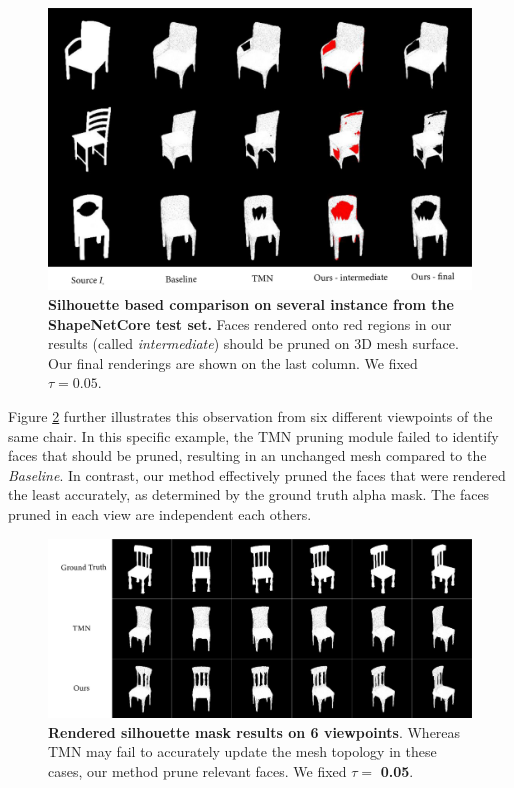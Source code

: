 \begin{figure}[htp!]%
\begin{center}
\includegraphics[width=\linewidth]{images/adaptativesr/highlight_faces_New.png}
\end{center}
    \caption{\textbf{Silhouette based comparison on several instance from the ShapeNetCore test set.} Faces rendered onto red regions in our results (called \textit{intermediate}) should be pruned on 3D mesh surface. Our final renderings are shown on the last column. We fixed $\tau = 0.05$.}
\label{fig:face2prune}
\end{figure}

Figure \ref{fig:pruning_multi_view} further illustrates this observation from six different viewpoints of the same chair. In this specific example, the TMN pruning module failed to identify faces that should be pruned, resulting in an unchanged mesh compared to the \textit{Baseline}. In contrast, our method effectively pruned the faces that were rendered the least accurately, as determined by the ground truth alpha mask. The faces pruned in each view are independent each others. 

\begin{figure}[htp!]%
\begin{center}
\includegraphics[width=\linewidth]{images/adaptativesr/severalview2D_New.png}
\end{center}
    \caption{\textbf{Rendered silhouette mask results on 6 viewpoints}. Whereas TMN \citep{pan2019deep} may fail to accurately update the mesh topology in these cases, our method prune relevant faces. We fixed $\tau = $ \textbf{0.05}.}
\label{fig:pruning_multi_view}
\end{figure}

